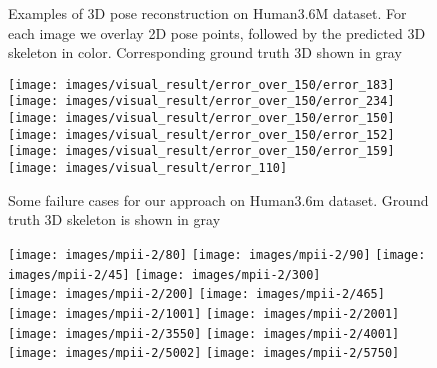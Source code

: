\documentclass[runningheads]{llncs}
\begin{document}
\begin{figure}[htb!]
	\caption{Examples of 3D pose reconstruction on Human3.6M dataset. For each image we overlay 2D pose points, followed by the predicted 3D skeleton in color. Corresponding ground truth 3D shown in gray}
	\label{fig:h36good}
\end{figure}\begin{figure}[htb]
	\centering
\texttt{[image: images/visual\_result/error\_over\_150/error\_183]}
\texttt{[image: images/visual\_result/error\_over\_150/error\_234]}
\texttt{[image: images/visual\_result/error\_over\_150/error\_150]} \\
\texttt{[image: images/visual\_result/error\_over\_150/error\_152]}
\texttt{[image: images/visual\_result/error\_over\_150/error\_159]}
\texttt{[image: images/visual\_result/error\_110]}
	\caption{Some failure cases for our approach on Human3.6m dataset. Ground truth 3D skeleton is shown in gray}
	\label{fig:h3failure}
\end{figure}\begin{figure}[htb!]
	\centering
	\texttt{[image: images/mpii-2/80]}
	\texttt{[image: images/mpii-2/90]}	
	\texttt{[image: images/mpii-2/45]}
	\texttt{[image: images/mpii-2/300]}\\

	\texttt{[image: images/mpii-2/200]}
	\texttt{[image: images/mpii-2/465]}	
	\texttt{[image: images/mpii-2/1001]}
	\texttt{[image: images/mpii-2/2001]}\\
	
	\texttt{[image: images/mpii-2/3550]}
	\texttt{[image: images/mpii-2/4001]}	
	\texttt{[image: images/mpii-2/5002]}
	\texttt{[image: images/mpii-2/5750]}\\
	

\end{figure}
\end{document}
